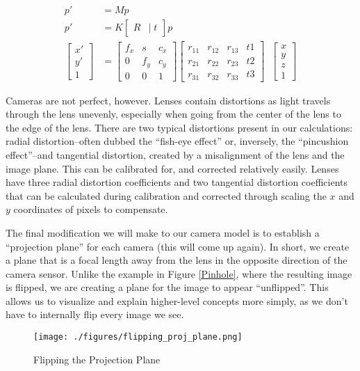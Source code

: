 \documentclass[
    12pt,
    twoside,
    bibstyle=chicago,
    headerstyle=uppercase,
	bibfile=biblatex_updating.bib
]{reedthesis}
\newcommand{\RT}{\begin{bmatrix}R &|\; t\end{bmatrix}}
\begin{document}
\begin{align*}
p' &= Mp\\
p' &= K\RT p\\
\begin{bmatrix}x' \\ y' \\ 1\end{bmatrix} &= \begin{bmatrix}f_x & s & c_x \\ 0 & f_y & c_y \\ 0 & 0 & 1\end{bmatrix} \begin{bmatrix} r_{11}&r_{12}&r_{13}&t{1}\\r_{21}&r_{22}&r_{23}&t{2}\\r_{31}&r_{32}&r_{33}&t{3}\end{bmatrix}\;\;\begin{bmatrix}x \\ y \\ z \\ 1\end{bmatrix} 
\end{align*}

Cameras are not perfect, however. Lenses contain distortions as light travels through the lens unevenly, especially when going from the center of the lens to the edge of the lens. There are two typical distortions present in our calculations: radial distortion--often dubbed the “fish-eye effect” or, inversely, the “pincushion effect”--and tangential distortion, created by a misalignment of the lens and the image plane. This can be calibrated for, and corrected relatively easily. Lenses have three radial distortion coefficients and two tangential distortion coefficients that can be calculated during calibration and corrected through scaling the $x$ and $y$ coordinates of pixels to compensate.

The final modification we will make to our camera model is to establish a “projection plane” for each camera (this will come up again). In short, we create a plane that is a focal length away from the lens in the opposite direction of the camera sensor. Unlike the example in Figure \ref{Pinhole}, where the resulting image is flipped, we are creating a plane for the image to appear “unflipped”. This allows us to visualize and explain higher-level concepts more simply, as we don't have to internally flip every image we see.

\begin{figure}[h]
	    \centering
	    \texttt{[image: ./figures/flipping\_proj\_plane.png]}
		
	    \caption{Flipping the Projection Plane}
	 \label{Flipping the Projection Plane}
	\end{figure}
\end{document}
